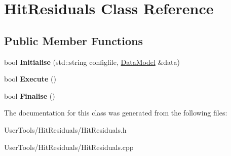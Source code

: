\hypertarget{classHitResiduals}{
\section{HitResiduals Class Reference}
\label{classHitResiduals}
}
\subsection*{Public Member Functions}
\begin{DoxyCompactItemize}
\item 
\hypertarget{classHitResiduals_ac37e7a71c2fece45c304383ace201de8}{
bool {\bfseries Initialise} (std::string configfile, \hyperlink{classDataModel}{DataModel} \&data)}
\label{classHitResiduals_ac37e7a71c2fece45c304383ace201de8}

\item 
\hypertarget{classHitResiduals_a6715e864b1c07e812178cc0d3b245339}{
bool {\bfseries Execute} ()}
\label{classHitResiduals_a6715e864b1c07e812178cc0d3b245339}

\item 
\hypertarget{classHitResiduals_a00c3b75308417bfd468cbb786104c26f}{
bool {\bfseries Finalise} ()}
\label{classHitResiduals_a00c3b75308417bfd468cbb786104c26f}

\end{DoxyCompactItemize}


The documentation for this class was generated from the following files:\begin{DoxyCompactItemize}
\item 
UserTools/HitResiduals/HitResiduals.h\item 
UserTools/HitResiduals/HitResiduals.cpp\end{DoxyCompactItemize}

